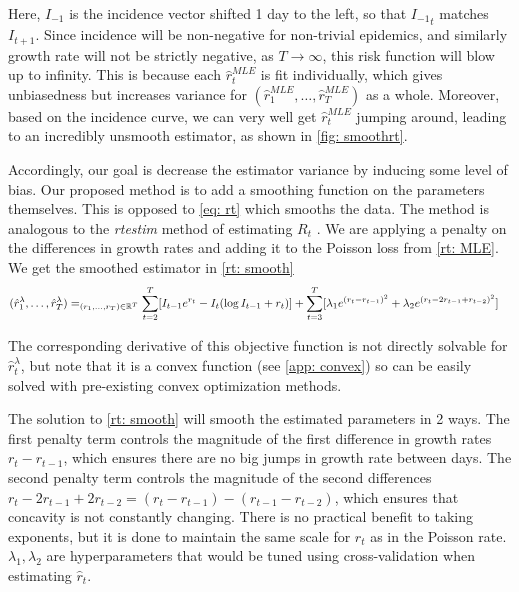 \documentclass[12pt]{article}
\let\argmin\relax\DeclareMathOperator*{\argmin}{argmin}
\begin{document}
      Here, $I_{-1}$ is the incidence vector shifted 1 day to the left, so that ${I_{-1}}_t$ matches $I_{t + 1}$. 
      Since incidence will be non-negative for non-trivial epidemics, and similarly growth rate will not be strictly negative, as $T \to \infty$, 
      this risk function will blow up to infinity. This is because each $\hat{r}_t^{MLE}$ is fit individually, 
      which gives unbiasedness but increases variance for $(\hat{r}_1^{MLE},\dots,\hat{r}_T^{MLE})$ as a whole. 
      Moreover, based on the incidence curve, we can very well get $\hat{r}_t^{MLE}$ jumping around, 
      leading to an incredibly unsmooth estimator, as shown in \cref{fig: smoothrt}. 
  
      Accordingly, our goal is decrease the estimator variance by inducing some level of bias. 
      Our proposed method is to add a smoothing function on the parameters themselves. This is opposed to 
      \cref{eq: rt} which smooths the data. The method is analogous to the \textit{rtestim} method of estimating $R_t$ \citep{Liu2024}.
      We are applying a penalty on the differences in growth rates and adding it to the Poisson loss
      from \cref{rt: MLE}. We get the smoothed estimator in \cref{rt: smooth}
      \begin{align} \label{rt: smooth}
          (\hat{r}_1^{\lambda},\dots,\hat{r}_T^{\lambda}) &= \argmin_{(r_1,\dots,r_T) \in \mathbb{R}^T} \sum_{t = 2}^T [I_{t - 1}e^{r_t} - I_t(\log{I_{t - 1}} + r_t)]
         + \sum_{t = 3}^T [\lambda_1 e^{(r_t - r_{t - 1})^2} + \lambda_2 e^{(r_t - 2r_{t - 1} + r_{t -2})^2}]
      \end{align}

      The corresponding derivative of this objective function is not directly solvable for $\hat{r}_t^{\lambda}$, 
      but note that it is a convex function (see \cref{app: convex}) so can be easily solved
      with pre-existing convex optimization methods.

      The solution to \cref{rt: smooth} will smooth the estimated parameters in 2 ways. The first penalty term controls
      the magnitude of the first difference in growth rates $r_t - r_{t - 1}$, which ensures there are no big jumps in growth rate between days. 
      The second penalty term controls
      the magnitude of the second differences $r_t - 2r_{t - 1} + 2r_{t - 2} = (r_t - r_{t - 1}) - (r_{t - 1} - r_{t - 2})$, 
      which ensures that concavity is not constantly changing. There is no practical benefit to taking exponents, but it is done to maintain the same scale 
      for $r_t$ as in the Poisson rate. $\lambda_1, \lambda_2$ are 
      hyperparameters that would be tuned using cross-validation when estimating $\hat{r}_t$.
\end{document}
